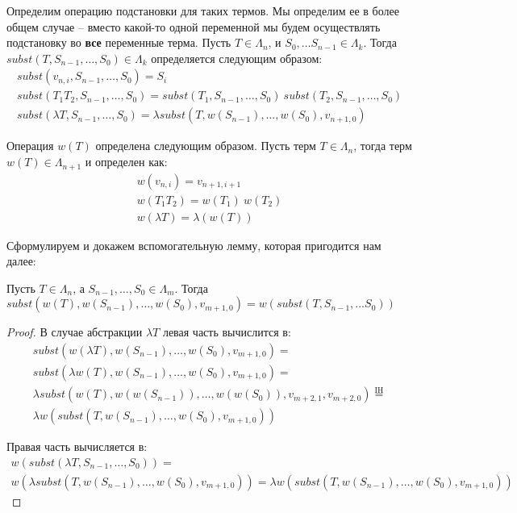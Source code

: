 Определим операцию подстановки для таких термов. Мы определим ее в более общем случае -- вместо какой-то одной переменной мы будем осуществлять подстановку во \textbf{все} переменные терма. Пусть $T \in \Lambda_{n}$, и $S_{0}, \dots S_{n-1} \in \Lambda_{k}$. Тогда $subst(T, S_{n - 1}, \dots, S_{0}) \in \Lambda_{k}$ определяется следующим образом:
\begin{gather*}
  subst(v_{n, i}, S_{n - 1}, \dots, S_{0}) = S_{i} \\
  subst(T_{1} T_{2}, S_{n - 1}, \dots, S_{0}) =  subst(T_{1}, S_{n - 1}, \dots, S_{0})\ subst(T_{2}, S_{n - 1}, \dots, S_{0}) \\
  subst(\lambda T, S_{n - 1}, \dots, S_{0}) = \lambda subst(T, w(S_{n - 1}), \dots, w(S_{0}), v_{n+1, 0})
\end{gather*}

Операция $w(T)$ определена следующим образом. Пусть терм $T \in \Lambda_{n}$, тогда терм $w(T) \in \Lambda_{n+1}$ и определен как:
\begin{gather*}
  w(v_{n, i}) = v_{n+1, i+1} \\
  w(T_{1} T_{2}) = w(T_1)\ w(T_2) \\
  w(\lambda T) = \lambda (w(T))
\end{gather*}

Сформулируем и докажем вспомогательную лемму, которая пригодится нам далее:
\begin{lemma}
  \label{index:weak_lemma}
  Пусть $T \in \Lambda_{n}$, а $S_{n-1}, \dots, S_{0} \in \Lambda_{m}$. Тогда $subst(w(T), w(S_{n-1}), \dots, w(S_{0}), v_{m+1, 0}) = w(subst(T, S_{n-1}, \dots S_{0}))$
\end{lemma}

\begin{proof}
  В случае абстракции $\lambda T$ левая часть вычислится в:
    \begin{gather*}
        subst(w(\lambda T), w(S_{n-1}), \dots, w(S_{0}), v_{m+1, 0}) = \\
        subst(\lambda w(T), w(S_{n-1}), \dots, w(S_{0}), v_{m+1, 0}) = \\
        \lambda subst(w(T), w(w(S_{n-1})), \dots, w(w(S_{0})), v_{m+2, 1}, v_{m+2,0}) \overset{\mathrm{IH}}{=} \\
        \lambda w(subst(T, w(S_{n-1}), \dots, w(S_{0}), v_{m+1, 0}))
    \end{gather*}

    Правая часть вычисляется в:
    \begin{gather*}
        w(subst(\lambda T, S_{n-1}, \dots, S_{0})) = \\
        w(\lambda subst(T, w(S_{n-1}), \dots, w(S_{0}), v_{m+1, 0})) =
        \lambda w(subst(T, w(S_{n-1}), \dots, w(S_{0}), v_{m+1, 0}))
    \end{gather*}
\end{proof}

